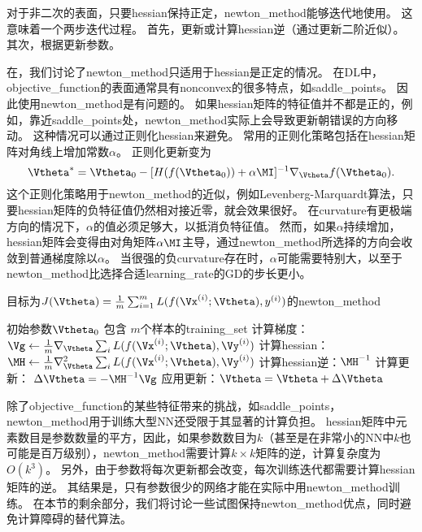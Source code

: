 对于非二次的表面，只要\gls{hessian}保持正定，\gls{newton_method}能够迭代地使用。
这意味着一个两步迭代过程。
首先，更新或计算\gls{hessian}逆（通过更新二阶近似）。
其次，根据更新参数。


在，我们讨论了\gls{newton_method}只适用于\gls{hessian}是正定的情况。
在\gls{DL}中，\gls{objective_function}的表面通常具有\gls{nonconvex}的很多特点，如\gls{saddle_points}。
因此使用\gls{newton_method}是有问题的。
如果\gls{hessian}矩阵的特征值并不都是正的，例如，靠近\gls{saddle_points}处，\gls{newton_method}实际上会导致更新朝错误的方向移动。
这种情况可以通过正则化\gls{hessian}来避免。
常用的正则化策略包括在\gls{hessian}矩阵对角线上增加常数$\alpha$。
正则化更新变为
\begin{equation}
    \Vtheta^* = \Vtheta_0 - [ H( f(\Vtheta_0)) + \alpha \MI  ]^{-1} \nabla_{\Vtheta} f(\Vtheta_0).
\end{equation}
这个正则化策略用于\gls{newton_method}的近似，例如Levenberg-Marquardt算法\citep{Levenberg44,Marquardt63}，只要\gls{hessian}矩阵的负特征值仍然相对接近零，就会效果很好。
在\gls{curvature}有更极端方向的情况下，$\alpha$的值必须足够大，以抵消负特征值。
然而，如果$\alpha$持续增加，\gls{hessian}矩阵会变得由对角矩阵$\alpha \MI$主导，通过\gls{newton_method}所选择的方向会收敛到普通梯度除以$\alpha$。
当很强的负\gls{curvature}存在时，$\alpha$可能需要特别大，以至于\gls{newton_method}比选择合适\gls{learning_rate}的\gls{GD}的步长更小。

\begin{algorithm}[ht]
\caption{目标为$J(\Vtheta)= \frac{1}{m} \sum_{i=1}^m L(f(\Vx^{(i)};\Vtheta), y^{(i)})$的\gls{newton_method}}
\label{alg:newton}
\begin{algorithmic}
\REQUIRE 初始参数$\Vtheta_{0}$
\REQUIRE 包含 $m$个样本的\gls{training_set}
      \STATE 计算梯度： $\Vg \leftarrow 
     \frac{1}{m} \nabla_{\Vtheta} \sum_i L(f(\Vx^{(i)};\Vtheta),\Vy^{(i)})$ 
      \STATE 计算\gls{hessian}：$\MH \leftarrow  
     \frac{1}{m} \nabla_{\Vtheta}^2 \sum_i L(f(\Vx^{(i)};\Vtheta),\Vy^{(i)})$ 
    \STATE 计算\gls{hessian}逆：$\MH^{-1}$
    \STATE 计算更新： $\Delta \Vtheta = - \MH^{-1} \Vg$
    \STATE 应用更新：$\Vtheta = \Vtheta+\Delta \Vtheta$
\ENDWHILE
\end{algorithmic}
\end{algorithm}


除了\gls{objective_function}的某些特征带来的挑战，如\gls{saddle_points}，\gls{newton_method}用于训练大型\gls{NN}还受限于其显著的计算负担。
\gls{hessian}矩阵中元素数目是参数数量的平方，因此，如果参数数目为$k$（甚至是在非常小的\gls{NN}中$k$也可能是百万级别），\gls{newton_method}需要计算$k\times k$矩阵的逆，计算复杂度为$O(k^3)$。
另外，由于参数将每次更新都会改变，每次训练迭代都需要计算\gls{hessian}矩阵的逆。
其结果是，只有参数很少的网络才能在实际中用\gls{newton_method}训练。
在本节的剩余部分，我们将讨论一些试图保持\gls{newton_method}优点，同时避免计算障碍的替代算法。

